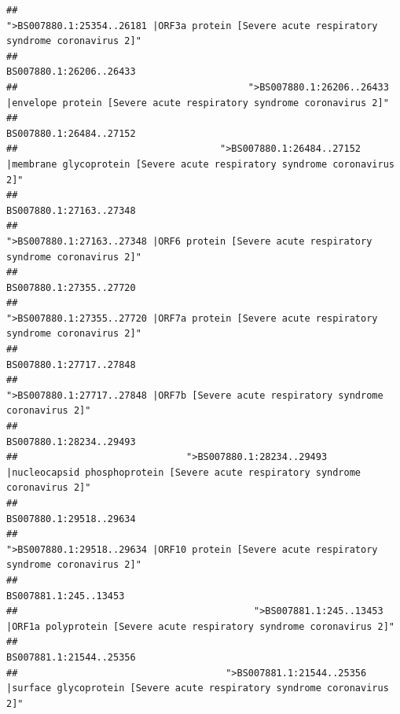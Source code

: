 \documentclass[
]{article}
\begin{document}
\begin{verbatim}
##                                            ">BS007880.1:25354..26181 |ORF3a protein [Severe acute respiratory syndrome coronavirus 2]" 
##                                                                                                                BS007880.1:26206..26433 
##                                         ">BS007880.1:26206..26433 |envelope protein [Severe acute respiratory syndrome coronavirus 2]" 
##                                                                                                                BS007880.1:26484..27152 
##                                    ">BS007880.1:26484..27152 |membrane glycoprotein [Severe acute respiratory syndrome coronavirus 2]" 
##                                                                                                                BS007880.1:27163..27348 
##                                             ">BS007880.1:27163..27348 |ORF6 protein [Severe acute respiratory syndrome coronavirus 2]" 
##                                                                                                                BS007880.1:27355..27720 
##                                            ">BS007880.1:27355..27720 |ORF7a protein [Severe acute respiratory syndrome coronavirus 2]" 
##                                                                                                                BS007880.1:27717..27848 
##                                                    ">BS007880.1:27717..27848 |ORF7b [Severe acute respiratory syndrome coronavirus 2]" 
##                                                                                                                BS007880.1:28234..29493 
##                              ">BS007880.1:28234..29493 |nucleocapsid phosphoprotein [Severe acute respiratory syndrome coronavirus 2]" 
##                                                                                                                BS007880.1:29518..29634 
##                                            ">BS007880.1:29518..29634 |ORF10 protein [Severe acute respiratory syndrome coronavirus 2]" 
##                                                                                                                  BS007881.1:245..13453 
##                                          ">BS007881.1:245..13453 |ORF1a polyprotein [Severe acute respiratory syndrome coronavirus 2]" 
##                                                                                                                BS007881.1:21544..25356 
##                                     ">BS007881.1:21544..25356 |surface glycoprotein [Severe acute respiratory syndrome coronavirus 2]" 

\end{verbatim}
\end{document}
